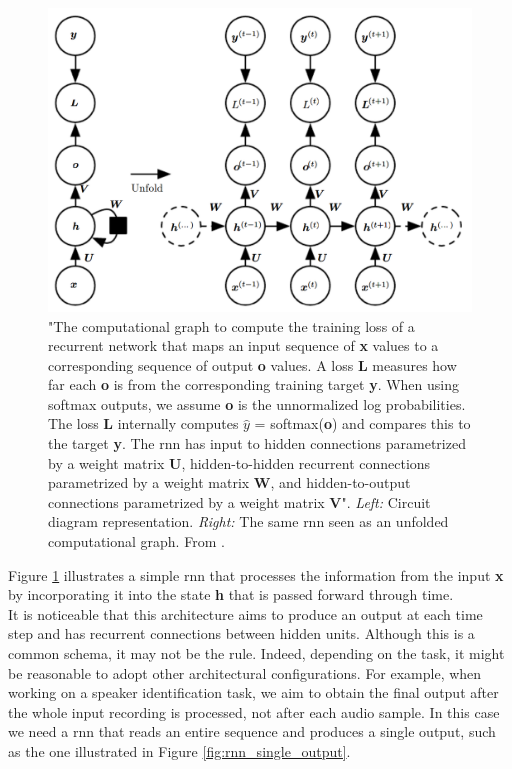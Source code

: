 \begin{figure}[H]
	\begin{center}
		\includegraphics[scale=.58]{img/rnn_graph.png}
		\captionsetup{margin=2cm}
		\caption{"The computational graph to compute the training loss of a recurrent network that maps an input sequence of \textbf{x} values to a corresponding sequence of output \textbf{o} values.	A loss \textbf{L} measures how far each \textbf{o} is from the corresponding training target \textbf{y}. When using softmax outputs, we assume \textbf{o} is the unnormalized log probabilities. The loss \textbf{L} internally computes \textbf{$\hat{y}$} = softmax(\textbf{o}) and compares this to the target \textbf{y}. The \gls{rnn} has input to hidden connections parametrized by a weight matrix \textbf{U}, hidden-to-hidden recurrent connections parametrized by a weight matrix \textbf{W}, and hidden-to-output connections parametrized by a weight matrix \textbf{V}". \textit{Left:} Circuit diagram representation. \textit{Right:} The same \gls{rnn} seen as an unfolded computational graph. From \cite{goodfellow2016deep}.}
		\label{fig:rnn_graph}
	\end{center}
\end{figure}
\noindent Figure \ref{fig:rnn_graph} illustrates a simple \gls{rnn} that processes the information from the input \textbf{x} by incorporating it into the state \textbf{h} that is passed forward through time. \\
It is noticeable that this architecture aims to produce an output at each time step and has recurrent connections between hidden units. Although this is a common schema, it may not be the rule. Indeed, depending on the task, it might be reasonable to adopt other architectural configurations. For example, when working on a speaker identification task, we aim to obtain the final output after the whole input recording is processed, not after each audio sample. In this case we need a \gls{rnn} that reads an entire sequence and produces a single output, such as the one illustrated in Figure \ref{fig:rnn_single_output}. \\
